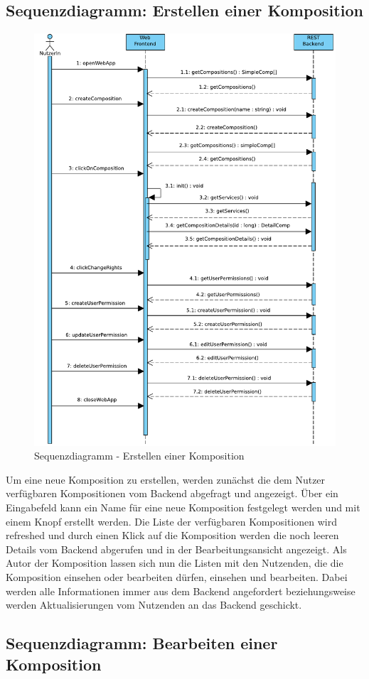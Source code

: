 \subsection*{Sequenzdiagramm: Erstellen einer Komposition}

\begin{figure}[!h]
	\centering
	\includegraphics[width=.5\textwidth]{img/Diagramme/Sequenz/Frontend_createComp}
			
	\caption{Sequenzdiagramm - Erstellen einer Komposition}
	\label{fig:sequenz-createComp}
\end{figure}

\noindent
Um eine neue Komposition zu erstellen, werden zunächst die dem Nutzer verfügbaren Kompositionen vom Backend abgefragt und angezeigt. Über ein Eingabefeld kann ein Name für eine neue Komposition festgelegt werden und mit einem Knopf erstellt werden. Die Liste der verfügbaren Kompositionen wird refreshed und durch einen Klick auf die Komposition werden die noch leeren Details vom Backend abgerufen und in der Bearbeitungsansicht angezeigt. Als Autor der Komposition lassen sich nun die Listen mit den Nutzenden, die die Komposition einsehen oder bearbeiten dürfen, einsehen und bearbeiten. Dabei werden alle Informationen immer aus dem Backend angefordert beziehungsweise werden Aktualisierungen vom Nutzenden an das Backend geschickt.

\newpage
\subsection*{Sequenzdiagramm: Bearbeiten einer Komposition}

